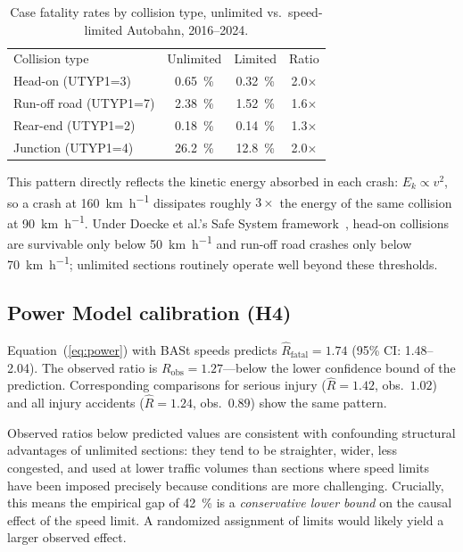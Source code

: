 \documentclass[aps,prl,twocolumn,superscriptaddress,longbibliography]{revtex4-2}
\begin{document}
\begin{table}[b]
  \caption{Case fatality rates by collision type, unlimited vs.\ speed-limited Autobahn, 2016--2024.}
  \label{tab:cfr}
  \begin{ruledtabular}
    \begin{tabular}{lccc}
      Collision type & Unlimited & Limited & Ratio \\
      \colrule
      Head-on (UTYP1=3)     & \SI{0.65}{\percent} & \SI{0.32}{\percent} & 2.0$\times$ \\
      Run-off road (UTYP1=7) & \SI{2.38}{\percent} & \SI{1.52}{\percent} & 1.6$\times$ \\
      Rear-end (UTYP1=2)    & \SI{0.18}{\percent} & \SI{0.14}{\percent} & 1.3$\times$ \\
      Junction (UTYP1=4)    & \SI{26.2}{\percent} & \SI{12.8}{\percent} & 2.0$\times$ \\
    \end{tabular}
  \end{ruledtabular}
\end{table}

This pattern directly reflects the kinetic energy absorbed in each crash:
$E_k \propto v^2$, so a crash at \SI{160}{\kilo\metre\per\hour} dissipates roughly
$3\times$ the energy of the same collision at \SI{90}{\kilo\metre\per\hour}.
Under Doecke et al.'s Safe System framework~\cite{Doecke2018}, head-on collisions
are survivable only below \SI{50}{\kilo\metre\per\hour} and run-off road crashes
only below \SI{70}{\kilo\metre\per\hour}; unlimited sections routinely operate well
beyond these thresholds.

\subsection{Power Model calibration (H4)}

Equation~(\ref{eq:power}) with BASt speeds predicts
$\hat{R}_\mathrm{fatal} = 1.74$ (95\% CI: 1.48--2.04).
The observed ratio is $R_\mathrm{obs} = 1.27$---below the lower confidence bound
of the prediction.
Corresponding comparisons for serious injury ($\hat{R} = 1.42$, obs.\ $1.02$) and
all injury accidents ($\hat{R} = 1.24$, obs.\ $0.89$) show the same pattern.

Observed ratios below predicted values are consistent with confounding structural
advantages of unlimited sections: they tend to be straighter, wider, less congested,
and used at lower traffic volumes than sections where speed limits have been imposed
precisely because conditions are more challenging.
Crucially, this means the empirical gap of \SI{42}{\percent} is a
\emph{conservative lower bound} on the causal effect of the speed limit.
A randomized assignment of limits would likely yield a larger observed effect.
\end{document}
